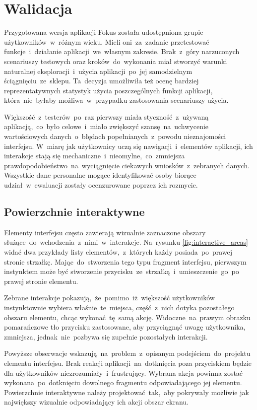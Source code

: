 \section{Walidacja}
Przygotowana wersja aplikacji Fokus została udostępniona grupie użytkowników~w~różnym wieku. Mieli oni~za~zadanie przetestować funkcje~i~działanie aplikacji~we~własnym zakresie. Brak~z~góry narzuconych scenariuszy testowych oraz kroków~do~wykonania miał stworzyć warunki naturalnej eksploracji~i~użycia aplikacji~po~jej samodzielnym ściągnięciu~ze~sklepu. Ta~decyzja umożliwiła też ocenę bardziej reprezentatywnych statystyk użycia poszczególnych funkcji aplikacji, która~nie~byłaby możliwa~w~przypadku zastosowania scenariuszy użycia. 

Większość~z~testerów~po~raz pierwszy miała styczność~z~używaną aplikacją,~co~było celowe~i~miało zwiększyć szansę~na~uchwycenie wartościowych danych~o~błędach popełnianych~z~powodu nieznajomości interfejsu. W~miarę jak użytkownicy uczą się nawigacji~i~elementów aplikacji, ich interakcje stają się mechaniczne~i~nieomylne,~co~zmniejsza prawdopodobieństwo~na~wyciągnięcie ciekawych wniosków~z~zebranych danych. Wszystkie dane personalne mogące identyfikować osoby biorące udział~w~ewaluacji zostały ocenzurowane poprzez ich rozmycie.

\subsection{Powierzchnie interaktywne}
Elementy interfejsu często zawierają wizualnie zaznaczone obszary służące~do~wchodzenia~z~nimi~w~interakcje. Na~rysunku \ref{fig:interactive_areas} widać dwa przykłady listy elementów,~z~których każdy posiada~po~prawej stronie strzałkę. Mając~do~stworzenia tego typu fragment interfejsu, pierwszym instynktem może być stworzenie przycisku~ze~strzałką~i~umieszczenie~go~po prawej stronie elementu.

Zebrane interakcje pokazują,~że~pomimo~iż~większość użytkowników instynktownie wybiera właśnie~te~miejsca, część~z~nich dotyka pozostałego obszaru elementu, chcąc wykonać~tę~samą akcję. Widoczne~na~prawym obrazku pomarańczowe tło przycisku zastosowane, aby przyciągnąć uwagę użytkownika, zmniejsza, jednak~nie~pozbywa się zupełnie pozostałych interakcji. 

Powyższe obserwacje wskazują~na~problem~z~opisanym podejściem~do~projektu elementu interfejsu. Brak reakcji aplikacji~na~dotknięcia poza przyciskiem będzie dla użytkowników niezrozumiały~i~frustrujący. Wybrana akcja powinna zostać wykonana~po~dotknięciu dowolnego fragmentu odpowiadającego jej elementu. Powierzchnie interaktywne należy projektować~tak,~aby pokrywały możliwie jak największy wizualnie odpowiadający ich akcji obszar ekranu.

